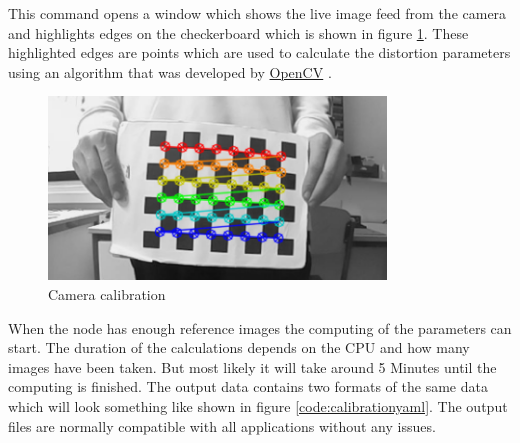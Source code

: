 This command opens a window which shows the live image feed from the camera and highlights edges on the checkerboard which is shown in figure \ref{img:cameracalibration}. These highlighted edges are points which are used to calculate the distortion parameters using an algorithm that was developed by \href{https://docs.opencv.org/2.4/doc/tutorials/calib3d/camera_calibration/camera_calibration.html}{OpenCV} \cite{cameracalibrationopencv}.\newline
\begin{figure}[h]
	\centering
	\includegraphics[width=0.8\textwidth]{./media/images/CameraCalibration.png}
  	\caption{Camera calibration}
  	\label{img:cameracalibration}
\end{figure} \newline

When the node has enough reference images the computing of the parameters can start. The duration of the calculations depends on the CPU and how many images have been taken. But most likely it will take around 5 Minutes until the computing is finished. The output data contains two formats of the same data which will look something like shown in figure \ref{code:calibrationyaml}. The output files are normally compatible with all applications without any issues.\newline



